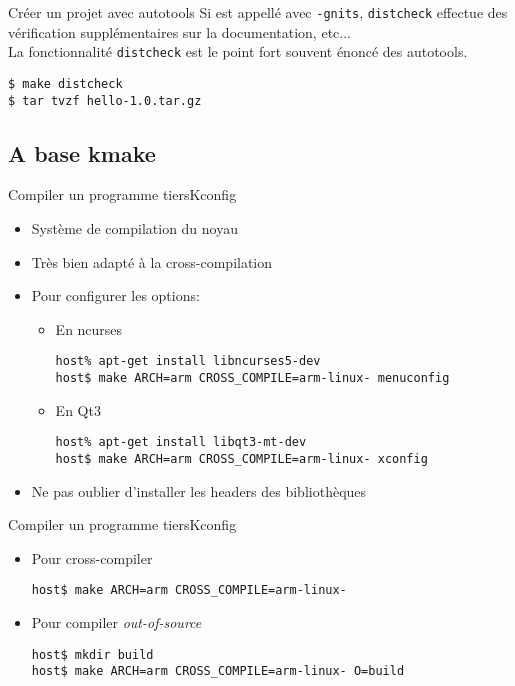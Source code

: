 \begin{frame}[fragile=singleslide]{Créer un projet avec autotools}
  Si   est appellé avec  \verb+-gnits+, \verb+distcheck+
  effectue des vérification supplémentaires sur la documentation,
  etc...
  \\[2ex]
  La fonctionnalité \verb+distcheck+ est  le point fort souvent énoncé
  des autotools.
\begin{lstlisting}
$ make distcheck
$ tar tvzf hello-1.0.tar.gz
\end{lstlisting} %
\end{frame}


\subsection{A base kmake}

\begin{frame}[fragile=singleslide]{Compiler un programme tiers}{Kconfig}
  \begin{itemize}
  \item Système de compilation du noyau
  \item Très bien adapté à la cross-compilation
  \item Pour configurer les options:
    \begin{itemize}
    \item En ncurses
\begin{lstlisting}
host% apt-get install libncurses5-dev
host$ make ARCH=arm CROSS_COMPILE=arm-linux- menuconfig
\end{lstlisting} %
    \item En Qt3
\begin{lstlisting}
host% apt-get install libqt3-mt-dev
host$ make ARCH=arm CROSS_COMPILE=arm-linux- xconfig
\end{lstlisting} %
    \end{itemize}
  \item Ne pas oublier d'installer les headers des bibliothèques
  \end{itemize}
\end{frame}

\begin{frame}[fragile=singleslide]{Compiler un programme tiers}{Kconfig}
  \begin{itemize}
  \item Pour cross-compiler
\begin{lstlisting}
host$ make ARCH=arm CROSS_COMPILE=arm-linux-
\end{lstlisting} %
  \item Pour compiler \emph{out-of-source}
\begin{lstlisting}
host$ mkdir build
host$ make ARCH=arm CROSS_COMPILE=arm-linux- O=build
\end{lstlisting} %
  \end{itemize}
\end{frame}

